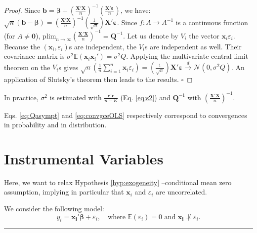 \documentclass[
]{book}
\theoremstyle{definition}
\theoremstyle{definition}
\theoremstyle{definition}
\theoremstyle{definition}
\theoremstyle{remark}
\begin{document}
\begin{proof}
Since \(\mathbf{b} = \boldsymbol\beta + \left( \frac{\mathbf{X}'\mathbf{X}}{n}\right)^{-1}\left(\frac{\mathbf{X}'\boldsymbol\varepsilon}{n}\right)\), we have: \(\sqrt{n}(\mathbf{b} - \boldsymbol\beta) = \left( \frac{\mathbf{X}'\mathbf{X}}{n}\right)^{-1} \left(\frac{1}{\sqrt{n}}\right)\mathbf{X}'\boldsymbol\varepsilon\). Since \(f:A \rightarrow A^{-1}\) is a continuous function (for \(A \ne \mathbf{0}\)), \(\mbox{plim}_{n \rightarrow \infty} \left(\frac{\mathbf{X}'\mathbf{X}}{n}\right)^{-1} = \mathbf{Q}^{-1}\). Let us denote by \(V_i\) the vector \(\mathbf{x}_i \varepsilon_i\). Because the \((\mathbf{x}_i,\varepsilon_i)\)s are independent, the \(V_i\)s are independent as well. Their covariance matrix is \(\sigma^2\mathbb{E}(\mathbf{x}_i \mathbf{x}_i')=\sigma^2Q\). Applying the multivariate central limit theorem on the \(V_i\)s gives \(\sqrt{n}\left(\frac{1}{n}\sum_{i=1}^n \mathbf{x}_i \varepsilon_i\right) = \left(\frac{1}{\sqrt{n}}\right)\mathbf{X}'\boldsymbol\varepsilon \overset{d}{\rightarrow} \mathcal{N}(0,\sigma^2Q)\). An application of Slutsky's theorem then leads to the results. \(\square\)
\end{proof}

In practice, \(\sigma^2\) is estimated with \(\frac{\mathbf{e}'\mathbf{e}}{n-K}\) (Eq. \eqref{eq:s2}) and \(\mathbf{Q}^{-1}\) with \(\left(\frac{\mathbf{X}'\mathbf{X}}{n}\right)^{-1}\).

Eqs. \eqref{eq:Qasympt} and \eqref{eq:convgceOLS} respectively correspond to convergences in probability and in distribution.

\hypertarget{instrumental-variables}{%
\section{Instrumental Variables}\label{instrumental-variables}}

Here, we want to relax Hypothesis \ref{hyp:exogeneity} --conditional mean zero assumption, implying in particular that \(\mathbf{x}_i\) and \(\varepsilon_i\) are uncorrelated.

We consider the following model:
\begin{equation}
y_i = \mathbf{x_i}'\boldsymbol\beta + \varepsilon_i, \quad \mbox{where } \mathbb{E}(\varepsilon_i)=0  \mbox{ and } \mathbf{x_i}\not\perp \varepsilon_i.\label{eq:modelIV}
\end{equation}

\begin{center}\rule{0.5\linewidth}{0.5pt}\end{center}
\end{document}
